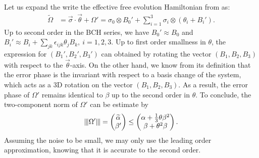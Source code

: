 \documentclass[aps,pra,reprint,superscriptaddress]{revtex4-2}
\newcommand{\alphat}{\widetilde{\alpha}}
\begin{document}
Let us expand the write the effective free evolution Hamiltonian from  as:
\begin{equation}\label{eq:eff-free-part}
\begin{aligned}
    \widetilde{\Omega} &= \vec\sigma \cdot \vec \theta + \Omega'=  \sigma_0 \otimes B_0' + \sum_{i=1}^3 \sigma_i \otimes (\theta_i + B_i' ).  
\end{aligned}
\end{equation}
Up to second order in the BCH series, we have $B_0'\approx B_0$ and 
$B_i'\approx B_i + \sum_{jk} \epsilon_{ijk} \theta_j B_k,\ i=1,2,3$. 
Up to first order smallness in $\theta$, the expression for $(B_1',B_2',B_3')$ can obtained by rotating the vector $(B_1,B_2,B_3)$ with respect to the $\vec \theta$-axis.
On the other hand,  we know from its definition that the error phase is the invariant with respect to a basis change of the system, which acts as a 3D rotation on the vector $(B_1,B_2,B_3)$.
As a result, the error phase of $\Omega'$ remains identical to $\beta$ up to the second order in $\theta$. To conclude, the two-component norm of $\Omega'$ can be estimate by
\begin{equation}\label{eq:eff-Hami-tcp}
    \opnorm{\Omega'} = \begin{pmatrix}
        \alphat \\
        \beta'
    \end{pmatrix}
    \le 
    \begin{pmatrix}
        \alpha + \frac{1}{3}\theta\beta^2  \\
        \beta + \theta^2 \beta
    \end{pmatrix}.
\end{equation}
Assuming the noise to be small, we may only use the leading order 
approximation, knowing that it is accurate to the second order. 
\end{document}
